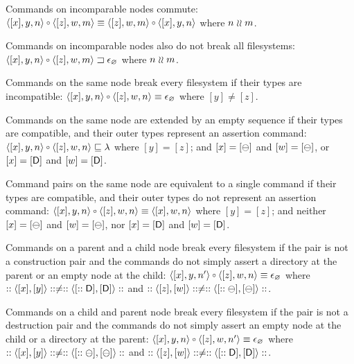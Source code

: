 \begin{mylem}
\begin{list}{\bf Rule~.}{}

\item[] %

\item{}
Commands on incomparable nodes commute:
$\cxynv\cc\czwmv \equiv \czwmv\cc\cxynv$ where $n\mathrel{\wr\wr} m$.

\item{}
Commands on incomparable nodes also do not break all filesystems:
$\wrksx{\cxynv\cc\czwmv}$ where $n\mathrel{\wr\wr} m$.

\item{}
Commands on the same node break every filesystem if their types are incompatible:
$\cxynv\cc\czwnv \equiv \cbrk$ where $[y]\ne [z]$.

\item{}
Commands on the same node are extended by an empty sequence if their types are compatible,
and their outer types represent an assertion command:
$\cxynv\cc\czwnv \eqext \emptyseq$ where $[y]=[z]$; and 
$[x]=[\ominus]$ and $[w]=[\ominus]$,
or $[x]=[\mathsf{D}]$ and $[w]=[\mathsf{D}]$.

\item{}
Command pairs on the same node are equivalent to a single command if their types are compatible,
and their outer types do not represent an assertion command:
$\cxynv\cc \czwnv \equiv \cxwnv$ where $[y]=[z]$; and
neither $[x]=[\ominus]$ and $[w]=[\ominus]$,
nor $[x]=[\mathsf{D}]$ and $[w]=[\mathsf{D}]$.

\item{}
Commands on a parent and a child node break every filesystem
if the pair is not a construction pair
and the commands do not simply assert a directory at the parent
or an empty node at the child:
$\cxynnv\cc\czwnv \equiv \cbrk$ where $::\langle{[x],[y]}\rangle::\neq::\langle{[::\mathsf{D}],[\mathsf{D}]}\rangle::$ and $::\langle{[z],[w]}\rangle::\neq::\langle{[::\ominus],[\ominus]}\rangle::$.

\item{}
Commands on a child and parent node break every filesystem
if the pair is not a destruction pair
and the commands do not simply assert an empty node at the child
or a directory at the parent:
$\cxynv\cc\czwnnv \equiv \cbrk$ where $::\langle{[x],[y]}\rangle::\neq::\langle{[::\ominus],[\ominus]}\rangle::$ and $::\langle{[z],[w]}\rangle::\neq::\langle{[::\mathsf{D}],[\mathsf{D}]}\rangle::$.


\end{list}
\end{mylem}
